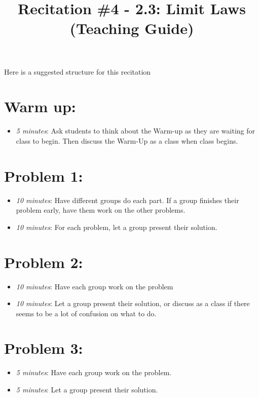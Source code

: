 \documentclass[handout,nooutcomes]{ximera}
\title{Recitation \#4 - 2.3:  Limit Laws (Teaching Guide)}
\begin{document}
\begin{abstract}		\end{abstract}
\maketitle

Here is a suggested structure for this recitation

\section*{Warm up:} 

	\begin{itemize}
	
	\item  \emph{5 minutes}: Ask students to think about the Warm-up as they are waiting for class to begin.  Then discuss the Warm-Up as a class when class begins. 
	
	\end{itemize}


\section*{Problem 1:}

	\begin{itemize}
	
	\item  \emph{10 minutes}:  Have different groups do each part.  If a group finishes their problem early, have them work on the other problems.
	
	\item  \emph{10 minutes}:  For each problem, let a group present their solution.
		
	\end{itemize}
	
	
	
\section*{Problem 2:}

	\begin{itemize}
	
	\item  \emph{10 minutes}:  Have each group work on the problem
	
	\item  \emph{10 minutes}:  Let a group present their solution, or discuss as a class if there seems to be a lot of confusion on what to do.
	
	\end{itemize}
	
	
	
\section*{Problem 3:}

	\begin{itemize}
	
	\item  \emph{5 minutes}:  Have each group work on the problem.
	
	\item  \emph{5 minutes}:  Let a group present their solution.
	
	\end{itemize}
	
	
	
\end{document}
